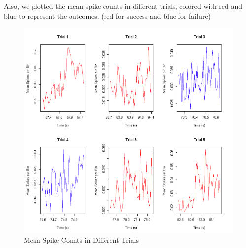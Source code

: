 \documentclass{article}
\begin{document}
	\par Also, we plotted the mean spike counts in different trials, colored with red and blue to represent the outcomes. (red for success and blue for failure)
	\begin{figure}[htbp]
		\centering
		\includegraphics[scale = 0.4]{Pics/021}
		\caption{Mean Spike Counts in Different Trials}
		\label{fig:021}
	\end{figure}
	\clearpage
\end{document}
